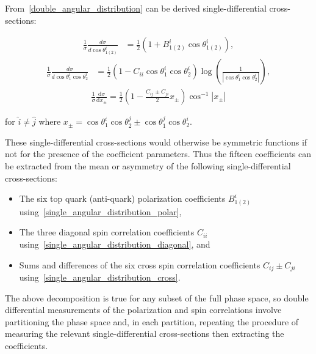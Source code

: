 From~\ref{double_angular_distribution} can be derived single-differential cross-sections:
\begin{linenomath*}
\begin{align}
\frac{1}{\sigma} \frac{d \sigma}{d \cos \theta_{1(2)}^i} & =\frac{1}{2}\left(1+B_{1(2)}^{i} \cos \theta_{1(2)}^i\right),
\label{single_angular_distribution_polar}
\end{align}
\begin{align}
\frac{1}{\sigma} \frac{d \sigma}{d \cos \theta_1^i \cos \theta_2^i} & =\frac{1}{2}\left(1 - C_{ii} \cos \theta_1^i \cos \theta_2^i\right) \log \left(\frac{1}{\left \vert \cos \theta_1^i \cos \theta_2^i\right \vert}\right),
\label{single_angular_distribution_diagonal}
\end{align}
\begin{align}
\frac{1}{\sigma} \frac{\mathrm{d} \sigma}{\mathrm{d} x_{\pm}} = \frac{1}{2} \left(1-\frac{C_{ij} \pm C_{ji}}{2} {x_{\pm}} \right) \cos ^{-1} \left \vert x_{\pm} \right \vert
\label{single_angular_distribution_cross}
\end{align}
\end{linenomath*}
\begin{center}
for $\hat{i} \neq \hat{j}$ where $x_{\pm} = \cos \theta_1^i \cos \theta_2^j \pm \cos \theta_1^j \cos \theta_2^i$.
\end{center}
These single-differential cross-sections would otherwise be symmetric functions if not for the presence of the coefficient parameters.
Thus the fifteen coefficients can be extracted from the mean or asymmetry of the following single-differential cross-sections:
\begin{itemize}
\item The six top quark (anti-quark) polarization coefficients $B_{1(2)}^{i}$ using~\ref{single_angular_distribution_polar},
\item  The three diagonal spin correlation coefficients $C_{ii}$ using~\ref{single_angular_distribution_diagonal}, and
\item  Sums and differences of the six cross spin correlation coefficients $C_{ij} \pm C_{ji}$ using~\ref{single_angular_distribution_cross}.
\end{itemize}

The above decomposition is true for any subset of the full phase space, so double differential measurements of the polarization and spin correlations involve partitioning the phase space and, in each partition, repeating the procedure of measuring the relevant single-differential cross-sections then extracting the coefficients.

